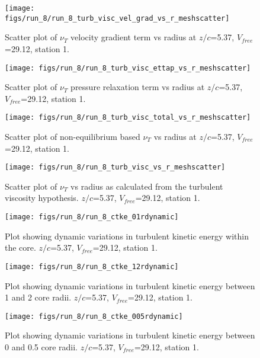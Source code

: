 \begin{figure}[H]
\centering
\texttt{[image: figs/run\_8/run\_8\_turb\_visc\_vel\_grad\_vs\_r\_meshscatter]}
\caption{Scatter plot of $\nu_T$ velocity gradient term vs radius at $z/c$=5.37, $V_{free}$=29.12, station 1.}
\end{figure}


\begin{figure}[H]
\centering
\texttt{[image: figs/run\_8/run\_8\_turb\_visc\_ettap\_vs\_r\_meshscatter]}
\caption{Scatter plot of $\nu_T$ pressure relaxation term vs radius at $z/c$=5.37, $V_{free}$=29.12, station 1.}
\end{figure}


\begin{figure}[H]
\centering
\texttt{[image: figs/run\_8/run\_8\_turb\_visc\_total\_vs\_r\_meshscatter]}
\caption{Scatter plot of non-equilibrium based $\nu_T$ vs radius at $z/c$=5.37, $V_{free}$=29.12, station 1.}
\end{figure}


\begin{figure}[H]
\centering
\texttt{[image: figs/run\_8/run\_8\_turb\_visc\_vs\_r\_meshscatter]}
\caption{Scatter plot of $\nu_T$ vs radius as calculated from the turbulent viscosity hypothesis. $z/c$=5.37, $V_{free}$=29.12, station 1.}
\end{figure}


\begin{figure}[H]
\centering
\texttt{[image: figs/run\_8/run\_8\_ctke\_01rdynamic]}
\caption{Plot showing dynamic variations in turbulent kinetic energy within the core. $z/c$=5.37, $V_{free}$=29.12, station 1.}
\end{figure}


\begin{figure}[H]
\centering
\texttt{[image: figs/run\_8/run\_8\_ctke\_12rdynamic]}
\caption{Plot showing dynamic variations in turbulent kinetic energy between 1 and 2 core radii. $z/c$=5.37, $V_{free}$=29.12, station 1.}
\end{figure}


\begin{figure}[H]
\centering
\texttt{[image: figs/run\_8/run\_8\_ctke\_005rdynamic]}
\caption{Plot showing dynamic variations in turbulent kinetic energy between 0 and 0.5 core radii. $z/c$=5.37, $V_{free}$=29.12, station 1.}
\end{figure}


